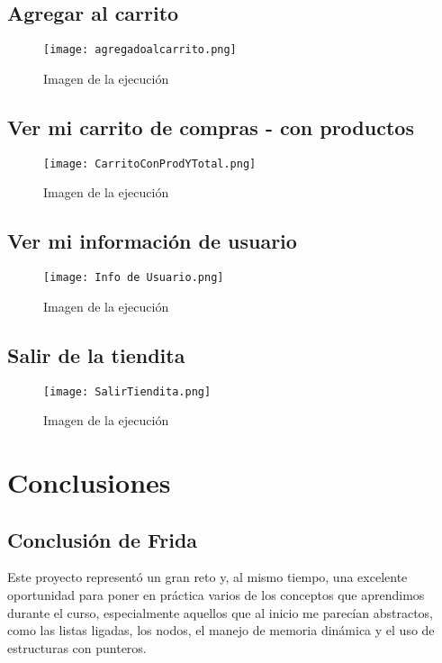 \documentclass{article}
\begin{document}
\subsection{Agregar al carrito}
  
\begin{figure}[!ht]
\centering
\texttt{[image: agregadoalcarrito.png]}
\caption{Imagen de la ejecución}
\end{figure}


\subsection{Ver mi carrito de compras - con productos}

  \begin{figure}[!ht]
\centering
\texttt{[image: CarritoConProdYTotal.png]}
\caption{Imagen de la ejecución}
\end{figure}
\pagebreak
\subsection{Ver mi información de usuario}

 \begin{figure}[!ht]
\centering
\texttt{[image: Info de Usuario.png]}
\caption{Imagen de la ejecución}
\end{figure}

  \subsection{Salir de la tiendita}

 \begin{figure}[!ht]
\centering
\texttt{[image: SalirTiendita.png]}
\caption{Imagen de la ejecución}
\end{figure}

\pagebreak
\section{Conclusiones}
\subsection{Conclusión de Frida}

Este proyecto representó un gran reto y, al mismo tiempo, una excelente oportunidad para poner en práctica varios de los conceptos que aprendimos durante el curso, especialmente aquellos que al inicio me parecían abstractos, como las listas ligadas, los nodos, el manejo de memoria dinámica y el uso de estructuras con punteros.
\end{document}
